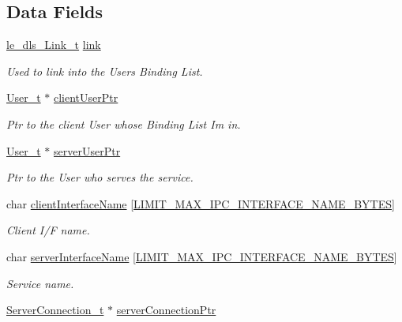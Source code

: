 \subsection*{Data Fields}
\begin{DoxyCompactItemize}
\item 
\hyperlink{structle__dls___link__t}{le\+\_\+dls\+\_\+\+Link\+\_\+t} \hyperlink{struct_binding__t_a7f2da1ff2af0c87f89064998398cf9e3}{link}
\begin{DoxyCompactList}\small\item\em Used to link into the User\textquotesingle{}s Binding List. \end{DoxyCompactList}\item 
\hyperlink{struct_user__t}{User\+\_\+t} $\ast$ \hyperlink{struct_binding__t_a15952b8fe0659f16c5f2bbba19b363f0}{client\+User\+Ptr}
\begin{DoxyCompactList}\small\item\em Ptr to the client User whose Binding List I\textquotesingle{}m in. \end{DoxyCompactList}\item 
\hyperlink{struct_user__t}{User\+\_\+t} $\ast$ \hyperlink{struct_binding__t_ab024fde9ce7c83355b56faaff60d5bcc}{server\+User\+Ptr}
\begin{DoxyCompactList}\small\item\em Ptr to the User who serves the service. \end{DoxyCompactList}\item 
char \hyperlink{struct_binding__t_a65550847a47f05270050453637324785}{client\+Interface\+Name} \mbox{[}\hyperlink{limit_8h_a06cfcaef1596f177e04ea0a131257c01}{L\+I\+M\+I\+T\+\_\+\+M\+A\+X\+\_\+\+I\+P\+C\+\_\+\+I\+N\+T\+E\+R\+F\+A\+C\+E\+\_\+\+N\+A\+M\+E\+\_\+\+B\+Y\+T\+ES}\mbox{]}
\begin{DoxyCompactList}\small\item\em Client I/F name. \end{DoxyCompactList}\item 
char \hyperlink{struct_binding__t_a383e8a5e7d911343fe040c0625a8f0ff}{server\+Interface\+Name} \mbox{[}\hyperlink{limit_8h_a06cfcaef1596f177e04ea0a131257c01}{L\+I\+M\+I\+T\+\_\+\+M\+A\+X\+\_\+\+I\+P\+C\+\_\+\+I\+N\+T\+E\+R\+F\+A\+C\+E\+\_\+\+N\+A\+M\+E\+\_\+\+B\+Y\+T\+ES}\mbox{]}
\begin{DoxyCompactList}\small\item\em Service name. \end{DoxyCompactList}\item 
\hyperlink{struct_server_connection__t}{Server\+Connection\+\_\+t} $\ast$ \hyperlink{struct_binding__t_a04269836a8e69839b361a0712a1bc6aa}{server\+Connection\+Ptr}

\end{DoxyCompactItemize}

